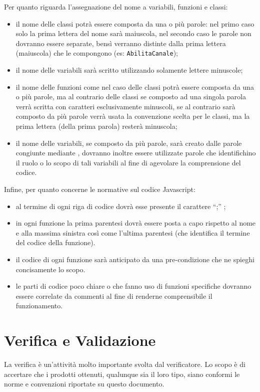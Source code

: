 {Per quanto riguarda l'assegnazione del nome a variabili, funzioni e classi:
\begin{itemize}
\item il nome delle classi potrà essere composta da una o più parole: nel primo caso solo la prima lettera del nome sarà maiuscola, nel secondo caso le parole non dovranno essere separate, bensì verranno distinte dalla prima lettera (maiuscola) che le compongono (es: \texttt{AbilitaCanale});
\item il nome delle variabili sarà scritto utilizzando solamente lettere minuscole;
\item il nome delle funzioni come nel caso delle classi potrà essere composta da una o più parole, ma al contrario delle classi se composto ad una singola parola verrà scritta con caratteri esclusivamente minuscoli, se al contrario sarà composto da più parole verrà usata la convenzione scelta per le classi, ma la prima lettera (della prima parola) resterà minuscola;
\item il nome delle variabili, se composto da più parole, sarà creato dalle parole congiunte mediante , dovranno inoltre essere utilizzate parole che identifichino il ruolo o lo scopo di tali variabili al fine di agevolare la comprensione del codice.
\end{itemize}

Infine, per quanto concerne le normative sul codice Javascript:
\begin{itemize}
\item al termine di ogni riga di codice dovrà esse presente il carattere ``;'' ;
\item in ogni funzione la prima parentesi dovrà essere posta a capo rispetto al nome e alla massima sinistra così come l'ultima parentesi (che identifica il termine del codice della funzione). 
\item il codice di ogni funzione sarà anticipato da una pre-condizione che ne spieghi concisamente lo scopo.
\item le parti di codice poco chiare o che fanno uso di funzioni specifiche dovranno essere correlate da commenti al fine di renderne comprensibile il funzionamento.
\end{itemize}

\clearpage
\section{Verifica e Validazione}
La verifica è un'attività molto importante svolta dal verificatore. Lo scopo è di accertare che i prodotti ottenuti, qualunque sia il loro tipo, siano conformi le norme e convenzioni riportate su questo documento.

}
